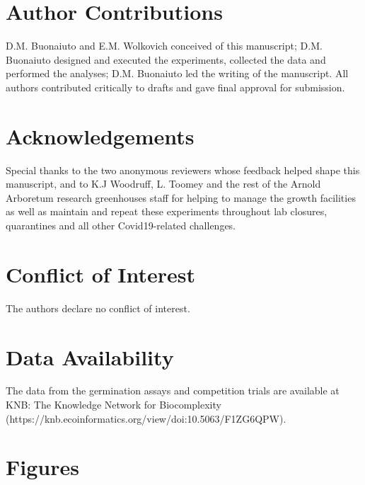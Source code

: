 \documentclass{article}[11pt]
\begin{document}
\section*{Author Contributions} 
D.M. Buonaiuto and E.M. Wolkovich conceived of this manuscript; D.M. Buonaiuto designed and executed the experiments, collected the data and performed the analyses; D.M. Buonaiuto led the writing of the manuscript. All authors contributed critically to drafts and gave final approval for submission.

\section*{Acknowledgements}
Special thanks to the two anonymous reviewers whose feedback helped shape this manuscript, and to K.J Woodruff, L. Toomey and the rest of the Arnold Arboretum research greenhouses staff for helping to manage the growth facilities as well as maintain and repeat these experiments throughout lab closures, quarantines and all other Covid19-related challenges.

\section*{Conflict of Interest}
The authors declare no conflict of interest.


\section*{Data Availability}
The data \citep{D-M-Buonaiuto:2023wj} from the germination assays and competition trials are available at KNB: The Knowledge Network for Biocomplexity (https://knb.ecoinformatics.org/view/doi:10.5063/F1ZG6QPW).


\section*{Figures}
\end{document}
